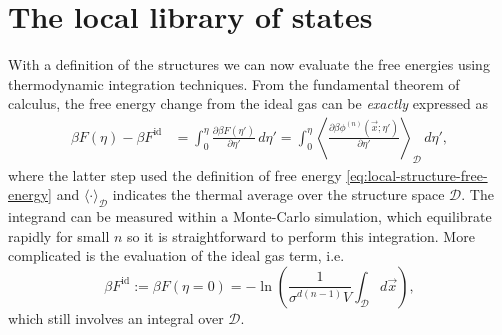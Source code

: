 \documentclass[11pt,twoside]{report}
\begin{document}
\section{The local library of states}

With a definition of the structures we can now evaluate the free energies using thermodynamic integration techniques.
From the fundamental theorem of calculus, the free energy change from the ideal gas can be \emph{exactly} expressed as \cite{Frenkel2002}
\begin{align}\label{eq:td-integration}
  \beta F(\eta)
  - \beta F^\mathrm{id}
  &=
  \int_0^\eta \frac{\partial \beta F(\eta')}{\partial \eta'} \, d\eta'
  =
  \int_0^\eta
  \left\langle
  \frac{\partial \beta \phi^{(n)}(\vec{x}; \eta')}{\partial \eta'}
  \right\rangle_\mathcal{D}
  \, d\eta',
\end{align}
where the latter step used the definition of free energy \eqref{eq:local-structure-free-energy} and $\langle \cdot \rangle_\mathcal{D}$ indicates the thermal average over the structure space $\mathcal{D}$.
The integrand can be measured within a Monte-Carlo simulation, which equilibrate rapidly for small $n$ so it is straightforward to perform this integration.
More complicated is the evaluation of the ideal gas term, i.e.\
\begin{equation}\label{eq:local-structure-free-energy-ideal}
  \beta F^\mathrm{id}
  :=
  \beta F(\eta=0)
  =
  -\ln{
    \left(
      \frac{1}{\sigma^{d(n-1)} V}
      \int_{\mathcal{D}} d\vec{x}
    \right)
  },
\end{equation}
which still involves an integral over $\mathcal{D}$.
\end{document}
